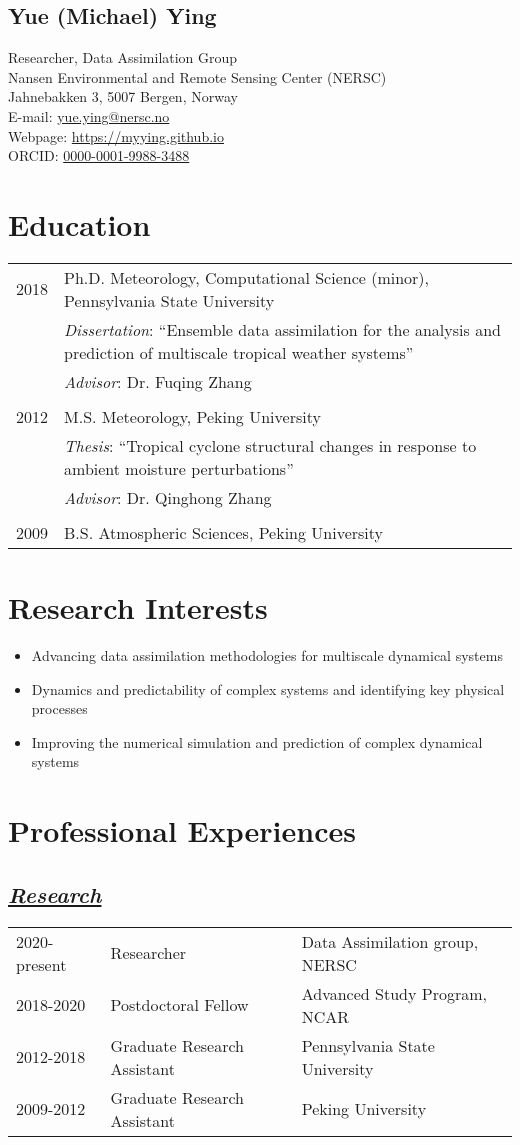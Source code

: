 \documentclass{article}
\newcommand{\cvsection}[1]{\section*{\bfseries#1}}
\newcommand{\cvsubsection}[1]{\subsection*{\itshape\uline{#1}}}
\begin{document}
\begin{center}
\section*{\textbf{Yue (Michael) Ying}}
Researcher, Data Assimilation Group \\
Nansen Environmental and Remote Sensing Center (NERSC) \\
Jahnebakken 3, 5007 Bergen, Norway \\
E-mail: \href{mailto:yue.ying@nersc.no}{yue.ying@nersc.no} \\
Webpage: \url{https://myying.github.io} \\
ORCID: \href{https://orcid.org/0000-0001-9988-3488}{0000-0001-9988-3488}
\end{center}

\cvsection{Education}
\begin{tabular}{l p{14cm}}
2018 & Ph.D. Meteorology, Computational Science (minor), Pennsylvania State University \\
 & \textit{Dissertation}: ``Ensemble data assimilation for the analysis and prediction of multiscale tropical weather systems'' \\
 & \textit{Advisor}: Dr. Fuqing Zhang \\
 & \\
2012 & M.S. Meteorology, Peking University \\
 & \textit{Thesis}: ``Tropical cyclone structural changes in response to ambient moisture perturbations'' \\
 & \textit{Advisor}: Dr. Qinghong Zhang \\
 & \\
2009 & B.S. Atmospheric Sciences, Peking University \\
\end{tabular}

\cvsection{Research Interests}
\begin{itemize}
\setlength\itemsep{0em}
\item Advancing data assimilation methodologies for multiscale dynamical systems
\item Dynamics and predictability of complex systems and identifying key physical processes
\item Improving the numerical simulation and prediction of complex dynamical systems
\end{itemize}

\cvsection{Professional Experiences}
\cvsubsection{Research}
\begin{tabular}{l l l}
    2020-present & Researcher & Data Assimilation group, NERSC \\
    2018-2020 & Postdoctoral Fellow & Advanced Study Program, NCAR \\
    2012-2018 & Graduate Research Assistant & Pennsylvania State University \\
    2009-2012 & Graduate Research Assistant & Peking University \\
\end{tabular}
\end{document}
